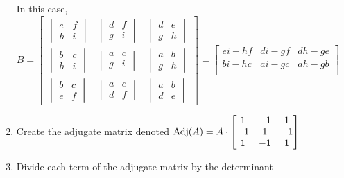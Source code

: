 \documentclass{report}
\begin{document}
\begin{enumerate}
    In this case, 
    $
        B=
        \begin{bmatrix}
            \begin{vmatrix}
                e & f \\
                h & i
            \end{vmatrix}
            &
            \begin{vmatrix}
                d & f \\
                g & i
            \end{vmatrix}
            &
            \begin{vmatrix}
                d & e \\
                g & h
            \end{vmatrix}
            \\
            \begin{vmatrix}
                b & c \\
                h & i
            \end{vmatrix}
            &
            \begin{vmatrix}
                a & c \\
                g & i
            \end{vmatrix}
            &
            \begin{vmatrix}
                a & b \\
                g & h
            \end{vmatrix}
            \\
            \begin{vmatrix}
                b & c \\
                e & f
            \end{vmatrix}
            &
            \begin{vmatrix}
                a & c \\
                d & f
            \end{vmatrix}
            &
            \begin{vmatrix}
                a & b \\
                d & e
            \end{vmatrix}
        \end{bmatrix}
        =
        \begin{bmatrix}
            ei-hf & di-gf & dh-ge \\
            bi-hc & ai-gc & ah-gb \\

        \end{bmatrix}
    $
    \item Create the adjugate matrix denoted
    $
        \Adj(A)=A \cdot 
        \begin{bmatrix}
            1 & -1 & 1 \\
            -1 & 1 & -1 \\
            1 & -1 & 1
        \end{bmatrix}
    $
    \item Divide each term of the adjugate matrix by the determinant
\end{enumerate}
\end{document}
